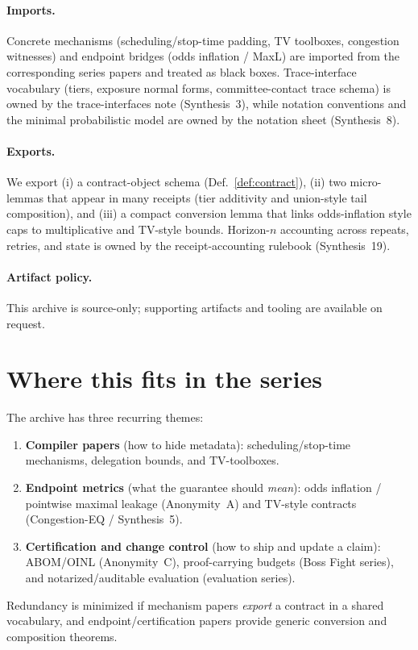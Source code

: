 \documentclass[11pt]{article}
\begin{document}
\paragraph{Imports.}
Concrete mechanisms (scheduling/stop-time padding, TV toolboxes, congestion witnesses) and endpoint bridges (odds inflation / MaxL) are imported from the corresponding series papers and treated as black boxes.
Trace-interface vocabulary (tiers, exposure normal forms, committee-contact trace schema) is owned by the trace-interfaces note (Synthesis~3), while notation conventions and the minimal probabilistic model are owned by the notation sheet (Synthesis~8).\cite{series:traceifaces,series:notation}

\paragraph{Exports.}
We export (i) a contract-object schema (Def.~\ref{def:contract}), (ii) two micro-lemmas that appear in many receipts (tier additivity and union-style tail composition), and (iii) a compact conversion lemma that links odds-inflation style caps to multiplicative and TV-style bounds. Horizon-$n$ accounting across repeats, retries, and state is owned by the receipt-accounting rulebook (Synthesis~19).\cite{series:accountingrulebook}

\paragraph{Artifact policy.}
This archive is source-only; supporting artifacts and tooling are available on request.\cite{series:artifactpolicy}


\section{Where this fits in the series}
The archive has three recurring themes:
\begin{enumerate}[leftmargin=*]
\item \textbf{Compiler papers} (how to hide metadata): scheduling/stop-time mechanisms, delegation bounds, and TV-toolboxes.
\item \textbf{Endpoint metrics} (what the guarantee should \emph{mean}): odds inflation / pointwise maximal leakage (Anonymity~A) and TV-style contracts (Congestion-EQ / Synthesis~5).
\item \textbf{Certification and change control} (how to ship and update a claim): ABOM/OINL (Anonymity~C), proof-carrying budgets (Boss Fight series), and notarized/auditable evaluation (evaluation series).
\end{enumerate}
Redundancy is minimized if mechanism papers \emph{export} a contract in a shared vocabulary, and endpoint/certification papers
provide generic conversion and composition theorems.
\end{document}
